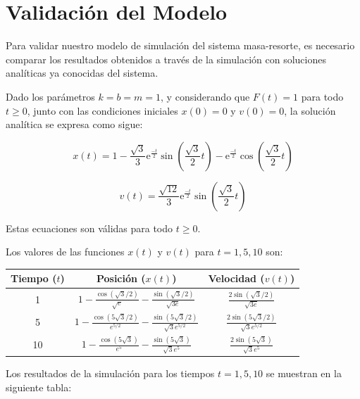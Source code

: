 \documentclass[]{article}
\begin{document}
\section{Validación del Modelo}
Para validar nuestro modelo de simulación del sistema masa-resorte, es necesario comparar los resultados obtenidos a través de la simulación con soluciones analíticas ya conocidas del sistema.

Dado los parámetros $k = b = m = 1$, y considerando que $F(t) = 1$ para todo $t \geq 0$, junto con las condiciones iniciales $x(0) = 0$ y $v(0) = 0$, la solución analítica se expresa como sigue:

\begin{equation}
x(t) = 1 - \frac{\sqrt{3}}{3} \mathrm{e}^{\frac{-t}{2}}\sin\left(\frac{\sqrt{3}}{2}t\right)-\mathrm{e}^{\frac{-t}{2}}\cos\left(\frac{\sqrt{3}}{2}t\right)
\end{equation}

\begin{equation}
v(t) = \frac{\sqrt{12}}{3} \mathrm{e}^{\frac{-t}{2}}\sin\left(\frac{\sqrt{3}}{2}t\right)
\end{equation}

Estas ecuaciones son válidas para todo $t \geq 0$.

Los valores de las funciones \(x(t)\) y \(v(t)\) para \(t = 1, 5, 10\) son:

\begin{table}[H]
    \centering
    \begin{tabular}{|c|c|c|}
    \hline
    \textbf{Tiempo ($t$)} & \textbf{Posición ($x(t)$)} & \textbf{Velocidad ($v(t)$)} \\
    \hline
    1 & \(1 - \frac{\cos(\sqrt{3}/2)}{\sqrt{e}} - \frac{\sin(\sqrt{3}/2)}{\sqrt{3e}}\) & \(\frac{2\sin(\sqrt{3}/2)}{\sqrt{3e}}\) \\
    \hline
    5 & \(1 - \frac{\cos(5\sqrt{3}/2)}{e^{5/2}} - \frac{\sin(5\sqrt{3}/2)}{\sqrt{3}e^{5/2}}\) & \(\frac{2\sin(5\sqrt{3}/2)}{\sqrt{3}e^{5/2}}\) \\
    \hline
    10 & \(1 - \frac{\cos(5\sqrt{3})}{e^5} - \frac{\sin(5\sqrt{3})}{\sqrt{3}e^5}\) & \(\frac{2\sin(5\sqrt{3})}{\sqrt{3}e^5}\) \\
    \hline
    \end{tabular}
\end{table}

Los resultados de la simulación para los tiempos \(t = 1, 5, 10\) se muestran en la siguiente tabla:

\end{document}
